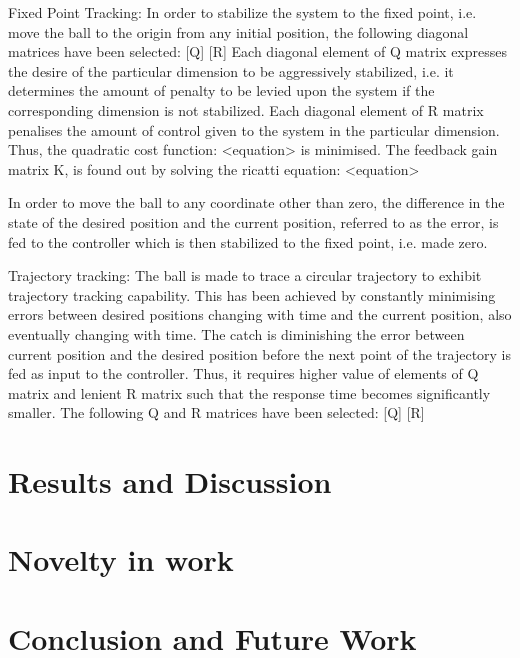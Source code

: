 \documentclass[conference]{IEEEtran}
\begin{document}
Fixed Point Tracking: In order to stabilize the system to the fixed point, i.e. move the ball to the origin from any initial position, the following diagonal matrices have been selected:
[Q] [R]
Each diagonal element of Q matrix expresses the desire of the particular dimension to be aggressively stabilized, i.e. it determines the amount of penalty to be levied upon the system if the corresponding dimension is not stabilized. Each diagonal element of R matrix penalises the amount of control given to the system in the particular dimension. Thus, the quadratic cost function: <equation>  is minimised. 
The feedback gain matrix K, is found out by solving the ricatti equation: <equation>

In order to move the ball to any coordinate other than zero, the difference in the state of the desired position and the current position, referred to as the error, is fed to the controller which is then stabilized to the fixed point, i.e. made zero.

Trajectory tracking: The ball is made to trace a circular trajectory to exhibit trajectory tracking capability. This has been achieved by constantly minimising errors between desired positions changing with time and the current position, also eventually changing with time. The catch is diminishing the error between current position and the desired position before the next point of the trajectory is fed as input to the controller. Thus, it requires higher value of elements of Q matrix and lenient R matrix such that the response time becomes significantly smaller. The following Q and R matrices have been selected: [Q] [R]

\section{Results and Discussion}

\section{Novelty in work}

\section{Conclusion and Future Work}
\end{document}
